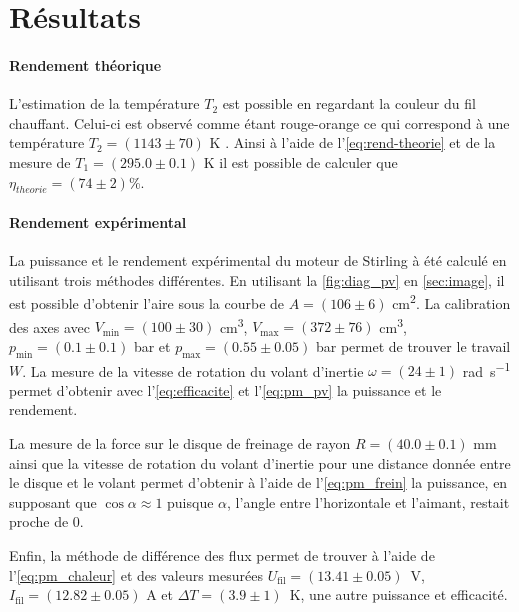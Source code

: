 \section{Résultats}

\paragraph*{Rendement théorique}
L'estimation de la température \(T_2\) est possible en regardant la couleur du fil chauffant. Celui-ci est observé comme étant rouge-orange ce qui correspond à une température \(T_2 = (1143 \pm 70)\) \si{\kelvin} \cite{temp-fil}. Ainsi à l'aide de l'\autoref{eq:rend-theorie} et de la mesure de \(T_1 = (295.0 \pm 0.1)\) \si{\kelvin} il est possible de calculer que \(\eta_{theorie} = (74 \pm 2)\)\%.

\paragraph*{Rendement expérimental}
La puissance et le rendement expérimental du moteur de Stirling à été calculé en utilisant trois méthodes différentes. En utilisant la \autoref{fig:diag_pv} en \autoref{sec:image}, il est possible d'obtenir l'aire sous la courbe de \(A = (106 \pm 6)\) \si{\centi\meter\squared}. La calibration des axes avec \(V_\textrm{min} = (100 \pm 30)\) \si{\centi\meter\cubed}, \(V_\textrm{max} = (372 \pm 76)\) \si{\centi\meter\cubed}, \(p_\textrm{min} = (0.1 \pm 0.1)\) \si{\bar} et \(p_\textrm{max} = (0.55 \pm 0.05)\) \si{\bar} permet de trouver le travail \(W\). La mesure de la vitesse de rotation du volant d'inertie \(\omega = (24 \pm 1)\) \si{\radian\per\second} permet d'obtenir avec l'\autoref{eq:efficacite} et l'\autoref{eq:pm_pv} la puissance et le rendement.

La mesure de la force sur le disque de freinage de rayon \(R = (40.0 \pm 0.1)\) \si{\milli\meter} ainsi que la vitesse de rotation du volant d'inertie pour une distance donnée entre le disque et le volant permet d'obtenir à l'aide de l'\autoref{eq:pm_frein} la puissance, en supposant que \(\cos{\alpha} \approx 1\) puisque \(\alpha\), l'angle entre l'horizontale et l'aimant, restait proche de 0.

Enfin, la méthode de différence des flux permet de trouver à l'aide de l'\autoref{eq:pm_chaleur} et des valeurs mesurées \mbox{\(U_\textrm{fil} = (13.41 \pm 0.05)\) \si{\volt}}, \mbox{\(I_\textrm{fil} = (12.82 \pm 0.05)\)} \si{\ampere} et \mbox{\(\Delta T = (3.9 \pm 1)\) \si{\kelvin}}, une autre puissance et efficacité.

